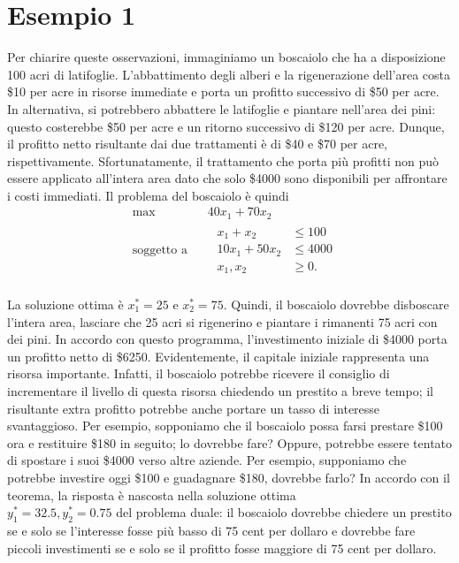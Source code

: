 \documentclass[a4paper,11pt]{article}
\begin{document}
\section*{Esempio 1}	Per chiarire queste osservazioni, immaginiamo un boscaiolo che ha a disposizione 100 acri di latifoglie. L'abbattimento degli alberi e la rigenerazione dell'area costa \$10 per acre in risorse immediate e porta un profitto successivo di \$50 per acre.
	In alternativa, si potrebbero abbattere le latifoglie e piantare nell'area dei pini: questo costerebbe \$50 per acre e un ritorno successivo di \$120 per acre. Dunque, il profitto netto risultante dai due trattamenti è di \$40 e \$70 per acre, rispettivamente. Sfortunatamente, il trattamento che porta più profitti non può essere applicato all'intera area dato che solo \$4000 sono disponibili per affrontare i costi immediati. Il problema del boscaiolo è quindi 
		\begin{equation}\begin{split}
	&\text{max}\qquad\qquad\ 40x_1+70x_2\\
	&\text{soggetto a} \qquad
	\begin{split} 
	 x_1+x_2&\leq 100\\
	10x_1+50x_2&\leq 4000\\
	x_1,x_2&\geq0.
	\end{split}
	\end{split}
	\end{equation}
	\\
	La soluzione ottima è $x^*_1=25$ e $x^*_2=75$. Quindi, il boscaiolo dovrebbe disboscare l'intera area, lasciare che 25 acri si rigenerino e piantare i rimanenti 75 acri con dei pini. In accordo con questo programma, l'investimento iniziale di \$4000 porta un profitto netto di \$6250.
	Evidentemente, il capitale iniziale rappresenta una risorsa importante. Infatti, il boscaiolo potrebbe ricevere il consiglio di incrementare il livello di questa risorsa chiedendo un prestito a breve tempo; il risultante extra profitto potrebbe anche portare un tasso di interesse svantaggioso. Per esempio, sopponiamo che il boscaiolo possa farsi prestare \$100 ora e restituire \$180 in seguito; lo dovrebbe fare? Oppure, potrebbe essere tentato di spostare i suoi \$4000 verso altre aziende. Per esempio, supponiamo che potrebbe investire oggi \$100 e guadagnare \$180, dovrebbe farlo?
	In accordo con il teorema, la risposta è nascosta nella soluzione ottima \\
	$y^*_1=32.5, y^*_2=0.75$
	del problema duale: il boscaiolo dovrebbe  chiedere un prestito se e solo se l'interesse fosse più basso di 75 cent per dollaro e dovrebbe fare piccoli investimenti se e solo se il profitto fosse maggiore di 75 cent per dollaro.
\end{document}
